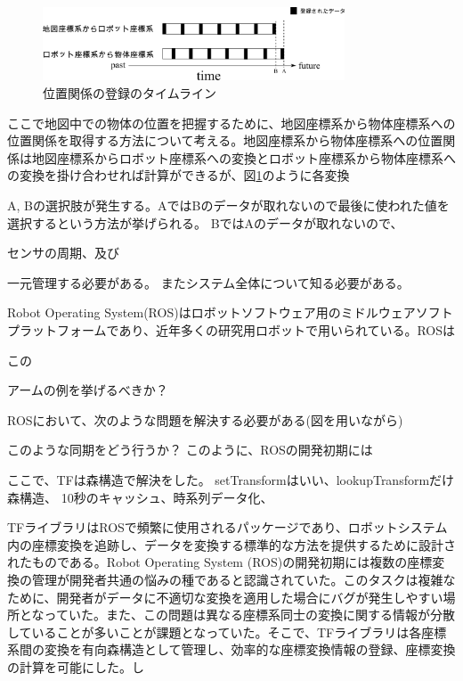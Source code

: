 \documentclass{jarticle}
\begin{document}
\begin{multicols}{2}
\begin{figure} 
\centering
\includegraphics[width=0.8\textwidth]{sensor-sync}	
\caption{位置関係の登録のタイムライン}
\label{fig:sensor-sync}
\end{figure}


ここで地図中での物体の位置を把握するために、地図座標系から物体座標系への位置関係を取得する方法について考える。地図座標系から物体座標系への位置関係は地図座標系からロボット座標系への変換とロボット座標系から物体座標系への変換を掛け合わせれば計算ができるが、図\ref{fig:sensor-sync}のように各変換

A, Bの選択肢が発生する。AではBのデータが取れないので最後に使われた値を選択するという方法が挙げられる。
BではAのデータが取れないので、



センサの周期、及び

一元管理する必要がある。
またシステム全体について知る必要がある。


Robot Operating System(ROS)\cite{ros}はロボットソフトウェア用のミドルウェアソフトプラットフォームであり、近年多くの研究用ロボットで用いられている。ROSは

この

アームの例を挙げるべきか？

ROSにおいて、次のような問題を解決する必要がある(図を用いながら)




このような同期をどう行うか？
このように、ROSの開発初期には

ここで、TFは森構造で解決をした。
setTransformはいい、lookupTransformだけ
森構造、 10秒のキャッシュ、時系列データ化、

TFライブラリはROSで頻繁に使用されるパッケージであり、ロボットシステム内の座標変換を追跡し、データを変換する標準的な方法を提供するために設計されたものである。Robot Operating System (ROS)の開発初期には複数の座標変換の管理が開発者共通の悩みの種であると認識されていた。このタスクは複雑なために、開発者がデータに不適切な変換を適用した場合にバグが発生しやすい場所となっていた。また、この問題は異なる座標系同士の変換に関する情報が分散していることが多いことが課題となっていた。そこで、TFライブラリは各座標系間の変換を有向森構造として管理し、効率的な座標変換情報の登録、座標変換の計算を可能にした。し



\end{multicols}
\end{document}
